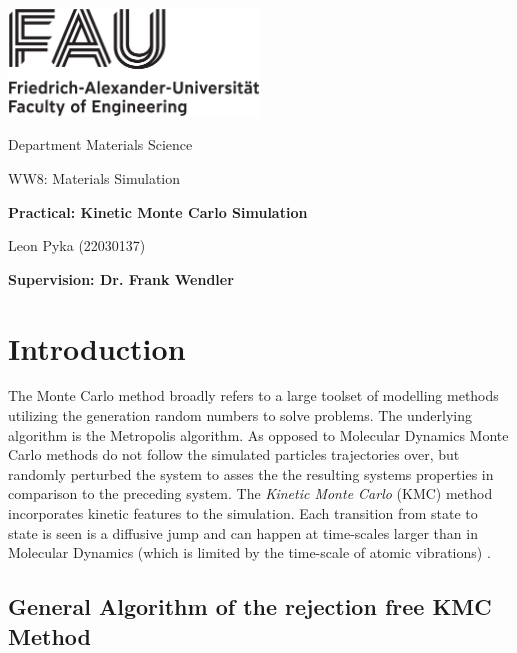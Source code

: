 




%
\begin{titlepage}
\begin{center}
\includegraphics[width=0.5\textwidth]{graphics/FAU_TechFak_EN_H_black.eps}

\LARGE Department Materials Science

\Large WW8: Materials Simulation

\LARGE \textbf{Practical: Kinetic Monte Carlo Simulation}



\vfil
\Large Leon Pyka (22030137)



\Large \textbf{Supervision: Dr. Frank Wendler}
\end{center}

\thispagestyle{empty}
%
\end{titlepage}
%

\setcounter{page}{1}
\tableofcontents
\newpage

\section{Introduction}
The Monte Carlo method broadly refers to a large toolset of modelling methods utilizing the generation random numbers to solve problems. The underlying algorithm is the Metropolis algorithm. As opposed to Molecular Dynamics Monte Carlo methods do not follow the simulated particles trajectories over, but randomly perturbed the system to asses the the resulting systems properties in comparison to the preceding system. The  \textit{Kinetic Monte Carlo} (KMC) method incorporates kinetic features to the simulation. Each transition from state to state is seen is a diffusive jump and can happen at time-scales larger than in Molecular Dynamics (which is limited by the time-scale of atomic vibrations) \cite{voter2007}. 


\subsection{General Algorithm of the rejection free KMC Method}\label{sec:general_kmc_algorithm}

